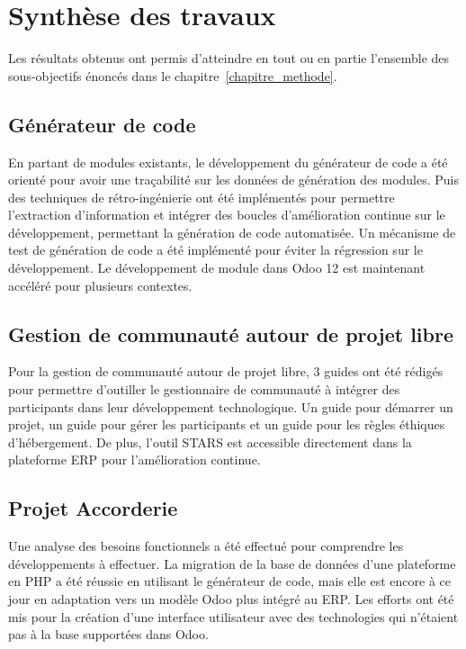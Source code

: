 \label{sec:Conclusion}

\section{Synthèse des travaux}
Les résultats obtenus ont permis d’atteindre en tout ou en partie l’ensemble des sous-objectifs énoncés dans le chapitre~\ref{chapitre_methode}.%


\subsection{Générateur de code}

En partant de modules existants, le développement du générateur de code a été orienté pour avoir une traçabilité sur les données de génération des modules. Puis des techniques de rétro-ingénierie ont été implémentés pour permettre l'extraction d'information et intégrer des boucles d'amélioration continue sur le développement, permettant la génération de code automatisée. Un mécanisme de test de génération de code a été implémenté pour éviter la régression sur le développement. Le développement de module dans Odoo 12 est maintenant accéléré pour plusieurs contextes.

\subsection{Gestion de communauté autour de projet libre}
Pour la gestion de communauté autour de projet libre, 3 guides ont été rédigés pour permettre d'outiller le gestionnaire de communauté à intégrer des participants dans leur développement technologique. Un guide pour démarrer un projet, un guide pour gérer les participants et un guide pour les règles éthiques d'hébergement. De plus, l'outil STARS est accessible directement dans la plateforme ERP pour l'amélioration continue.

\subsection{Projet Accorderie}

Une analyse des besoins fonctionnels a été effectué pour comprendre les développements à effectuer. La migration de la base de données d'une plateforme en PHP a été réussie en utilisant le générateur de code, mais elle est encore à ce jour en adaptation vers un modèle Odoo plus intégré au ERP. Les efforts ont été mis pour la création d’une interface utilisateur avec des technologies qui n’étaient pas à la base supportées dans Odoo.

